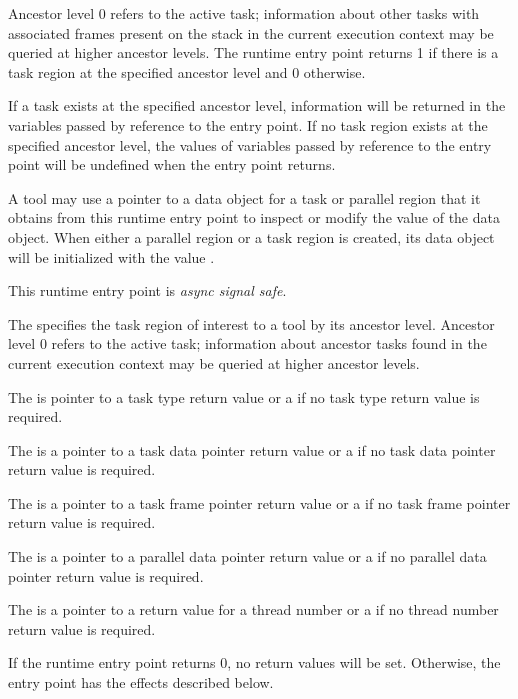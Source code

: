 Ancestor level 0 refers to the active task; information about
other tasks with associated frames present on the stack in the current execution context may be queried at
higher ancestor levels.  The  runtime entry point
returns 1 if there is a task region at the
specified ancestor level and 0 otherwise. 

If a task exists at the specified ancestor level, information
will be returned in the variables passed by reference to the entry
point.  If no task region exists at the specified ancestor level, the
values of variables passed by reference to the entry point will be
undefined when the entry point returns.

A tool may use a pointer to a data object for a task or parallel
region that it obtains from this runtime entry point to inspect or modify the
value of the data object.  When either a parallel region or a task
region is created, its data object will be initialized with the value
.

This runtime entry point is \emph{async signal safe}.

\argdesc

The \callbackarg{}  specifies the task region
of interest to a tool by its ancestor level.  Ancestor level 0 refers
to the active task; information about
ancestor tasks found in the current execution context may be queried at
higher ancestor levels.  

The \callbackarg{}  is pointer to a task type return
value or a  if no task type return value is required.

The \callbackarg{}  is a pointer to a task data
pointer return value
or a  if no task data pointer return value is required.


The \callbackarg{}  is a pointer to a task frame
pointer return value 
or a  if no task frame pointer return value is required.

The \callbackarg{}  is a pointer to a parallel
data pointer return value 
or a  if no parallel data pointer return value is required.

The \callbackarg{}  is a pointer to a return value
for a thread number 
or a  if no thread number return value is required.

\effect


If the runtime entry point returns 0, no return values will be set.
Otherwise, the entry point has the effects described below.

